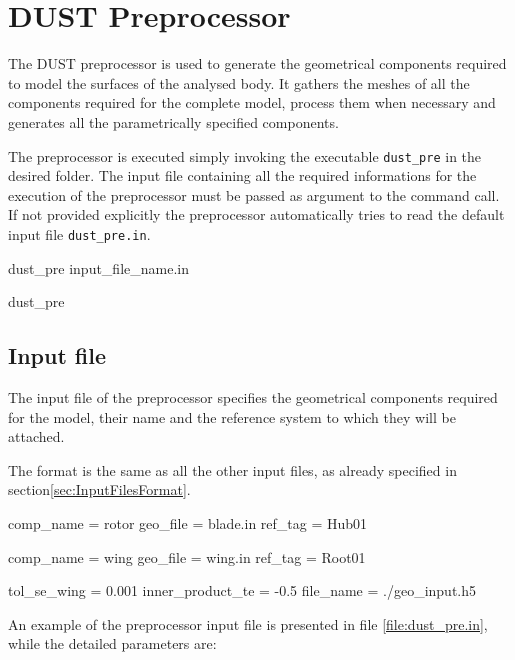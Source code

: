 \chapter{DUST Preprocessor}
\label{ch:Pre}

The DUST preprocessor is used to generate the geometrical components required to model 
the surfaces of the analysed body. It gathers the meshes of all the components required 
for the complete model, process them when necessary and generates all the parametrically 
specified components. 

The preprocessor is executed simply invoking the executable \texttt{dust\_pre} in the desired folder. 
The input file containing all the required informations for the execution of the preprocessor must be 
passed as argument to the command call. If not provided explicitly the preprocessor automatically 
tries to read the default input file \texttt{dust\_pre.in}.
\begin{command}[caption={Preprocessor command looking for input file \texttt{input\_file\_name.in}}]
  dust_pre input_file_name.in
\end{command}

\begin{command}[caption={Preprocessor command looking for 
default input file \texttt{dust\_pre.in}}, label={command:dus_pre_default}]
  dust_pre
\end{command}


\section{Input file}
\label{sec:Pre_InputFile}

The input file of the preprocessor specifies the geometrical components required 
for the model, their name and the reference system to which they will be attached.

The format is the same as all the other input files, as already specified in 
section\ref{sec:InputFilesFormat}.

\begin{inputfile}[frame=single, caption={dust_pre.in}, label={file:dust_pre.in}]
comp_name = rotor
geo_file  = blade.in
ref_tag   = Hub01

comp_name = wing
geo_file  = wing.in
ref_tag   = Root01

tol_se_wing  = 0.001
inner_product_te = -0.5
file_name = ./geo_input.h5 
\end{inputfile}

An example of the preprocessor input file is presented in file 
\ref{file:dust_pre.in}, while the detailed parameters are:

